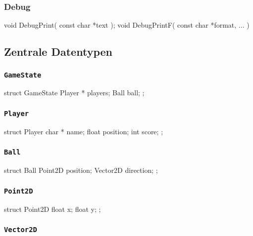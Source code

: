 \documentclass{homework-pp}
\renewcommand{\c}[1]{\lstinline[language=c,basicstyle=\ttfamily]|#1|}
\begin{document}
\subsubsection{Debug}

\begin{cblock}
void DebugPrint( const char *text );
void DebugPrintF( const char *format, ... )
\end{cblock}

\subsection{Zentrale Datentypen}

\subsubsection{\c{GameState}}

\begin{cblock}
struct GameState {
	Player *	players;
	Ball		ball;
};
\end{cblock}

\subsubsection{\c{Player}}

\begin{cblock}
struct Player {
	char *	name;
	float	position;
	int		score;
};
\end{cblock}

\subsubsection{\c{Ball}}

\begin{cblock}
struct Ball {
	Point2D		position;
	Vector2D	direction;
};
\end{cblock}

\subsubsection{\c{Point2D}}

\begin{cblock}
struct Point2D {
	float x;
	float y;
};
\end{cblock}

\subsubsection{\c{Vector2D}}
\end{document}
